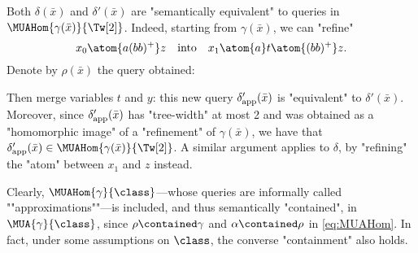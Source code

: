 \begin{example}
    \AP\label{ex:CRPQ-tw3-stw2-contd}
    Both $\delta(\bar x)$ and $\delta'(\bar x)$ are "semantically equivalent" 
    to queries in $\MUAHom{\gamma(\bar x)}{\Tw[2]}$.
    Indeed, starting from $\gamma(\bar x)$,
    we can "refine"
	\[
		x_0 \atom{a(bb)^+} z
		\quad\text{into}\quad
		x_1 \atom{a} t \atom{(bb)^+} z.
	\]
    Denote by $\rho(\bar x)$ the query obtained:
    \begin{center}
        \small
    \end{center}
    Then merge variables $t$ and $y$: this new query $\delta'_{\textnormal{app}}(\bar x)$
    is "equivalent" to $\delta'(\bar x)$. Moreover, since
	$\delta'_{\textnormal{app}}(\bar x)$ has "tree-width" at most 2 and was obtained as a 
	"homomorphic image" of a "refinement" of $\gamma(\bar x)$, we have that
	$\delta'_{\textnormal{app}}(\bar x) \in \MUAHom{\gamma(\bar x)}{\Tw[2]}$.
	A similar argument applies to $\delta$, by "refining" the "atom" between $x_1$ and $z$ instead.
	\qedhere
\end{example}


\AP Clearly, $\MUAHom{\gamma}{\class}$---whose queries are informally called 
""approximations""---is included, and thus semantically "contained", in $\MUA{\gamma}{\class}$, 
since $\rho \contained \gamma$ and $\alpha \contained \rho$ in \eqref{eq:MUAHom}.
In fact, under some assumptions on $\class$,
the converse "containment" also holds. 

